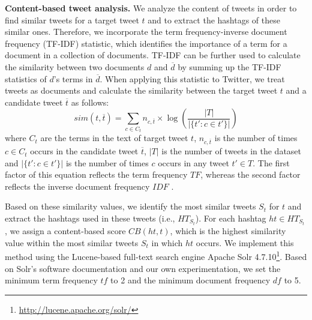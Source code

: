 \documentclass{sig-alternate-05-2015}
\newcommand{\para}[1]{\vspace{2mm}\noindent\textbf{#1}}
\begin{document}
\para{Content-based tweet analysis.} We analyze the content of tweets in order to find similar tweets for a target tweet $t$ and to extract the hashtags of these similar ones. Therefore, we incorporate the term frequency-inverse document frequency (TF-IDF) statistic, which identifies the importance of a term for a document in a collection of documents. TF-IDF can be further used to calculate the similarity between two documents $d$ and $\overline{d}$ by summing up the TF-IDF statistics of $d$'s terms in $\overline{d}$. When applying this statistic to Twitter, we treat tweets as documents and calculate the similarity between the target tweet $t$ and a candidate tweet $\overline{t}$ as follows:
\begin{equation}
    sim(t, \overline{t}) = \sum\limits_{c \in C_t}{n_{c,\overline{t}} \times \log(\frac{|T|}{|\{t': c \in t'\}|})}
\end{equation}
where $C_t$ are the terms in the text of target tweet $t$, $n_{c, \overline{t}}$ is the number of times $c \in C_t$ occurs in the candidate tweet $\overline{t}$, $|T|$ is the number of tweets in the dataset and $|\{t': c \in t'\}|$ is the number of times $c$ occurs in any tweet $t' \in T$. The first factor of this equation reflects the term frequency $TF$, whereas the second factor reflects the inverse document frequency $IDF$ \cite{zangerle2011recommending}.

Based on these similarity values, we identify the most similar tweets $S_t$ for $t$ and extract the hashtags used in these tweets (i.e., $HT_{S_t}$). For each hashtag $ht \in HT_{S_t}$, we assign a content-based score $CB(ht, t)$, which is the highest similarity value within the most similar tweets $S_t$ in which $ht$ occurs. We implement this method using the Lucene-based full-text search engine Apache Solr 4.7.10\footnote{\url{http://lucene.apache.org/solr/}}. Based on Solr's software documentation and our own experimentation, we set the minimum term frequency $tf$ to 2 and the minimum document frequency $df$ to 5.
\end{document}
